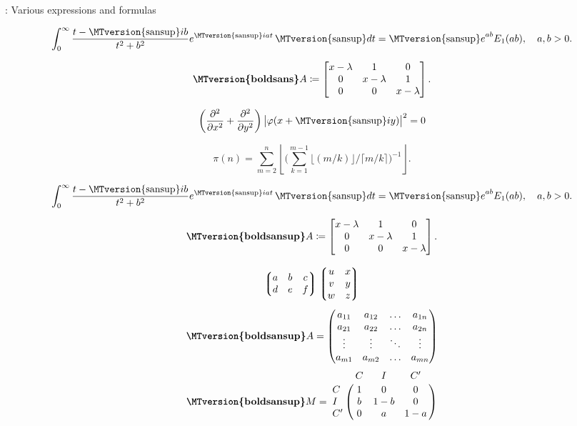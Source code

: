 \documentclass[aspectratio = 169, t, 10pt]{beamer}
\newcommand{\bm}[1]{\textbf{\MTversion{boldsans}\(#1\)}}
\providecommand{\mathbfit}[1]{\bm{#1}}
\renewcommand{\mathrm}[1]{\textrm{\MTversion{sansup}\(#1\)}}%
\renewcommand{\mathbf}[1]{\textbf{\MTversion{boldsansup}\(#1\)}}%
\begin{document}
\begin{frame}[allowframebreaks]{\insertsection: Various expressions and formulas}

$$\int_0^\infty \frac{t - \mathrm{i} b}{t^2 + b^2}e^{\mathrm{i}at}\,\mathrm{d}t = \mathrm{e}^{ab}E_1(ab), \quad
a,b > 0.$$


$$\mathbfit{A} \coloneq \begin{bmatrix}x-\lambda&1&0\\
0&x-\lambda&1\\
0&0&x-\lambda\end{bmatrix}.$$

\framebreak

\begingroup
\boldmath


$$\left(\frac{\partial^2}{\partial x^2} + \frac{\partial^2}{\partial y^2}\right)
\bigl|\varphi(x+\mathrm{i}y)\bigr|^2=0$$



$$\pi(n)=\sum_{m=2}^n\left\lfloor\Biggl(\sum_{k=1}^{m-1}\bigl
\lfloor(m/k)\bigr\rfloor \Big/ \lceil m/k\rceil\Biggr)^{-1}\right\rfloor.$$


$$\int_0^\infty \frac{t - \mathrm{i} b}{t^2 + b^2}e^{\mathrm{i}at}\,\mathrm{d}t = \mathrm{e}^{ab}E_1(ab), \quad
a,b > 0.$$


$$\mathbf{A} \coloneq \begin{bmatrix}x-\lambda&1&0\\
0&x-\lambda&1\\
0&0&x-\lambda\end{bmatrix}.$$

\endgroup

\framebreak

$$\left\lgroup\begin{matrix}a&b&c\\ d&e&f\\\end{matrix}\right\rgroup
\left\lgroup\begin{matrix}u&x\cr v&y\cr w&z\end{matrix}\right\rgroup$$
$$\mathbf{A} = \begin{pmatrix}a_{11}&a_{12}&\ldots&a_{1n}\\
a_{21}&a_{22}&\ldots&a_{2n}\\
\vdots&\vdots&\ddots&\vdots\\
a_{m1}&a_{m2}&\ldots&a_{mn}\end{pmatrix}$$
$$\mathbf{M}=\bordermatrix{&C&I&C'\cr
	C&1&0&0\cr I&b&1-b&0\cr C'&0&a&1-a}$$


\end{frame}
\end{document}
